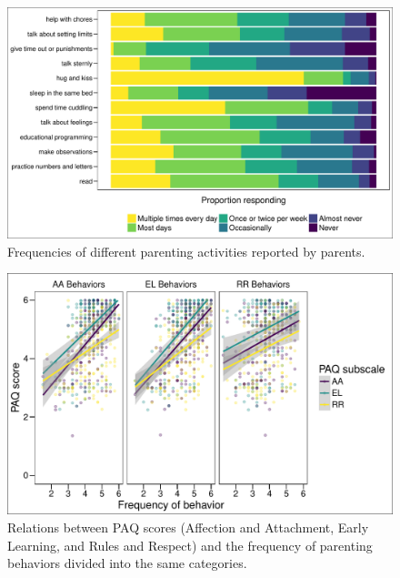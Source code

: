 \documentclass[man]{apa6}
\theoremstyle{definition}
\theoremstyle{definition}
\theoremstyle{definition}
\theoremstyle{remark}
\begin{document}
\begin{figure}
\centering
\includegraphics{PAQ_paper_files/figure-latex/behavefreq-1.pdf}
\caption{\label{fig:behavefreq}Frequencies of different parenting activities
reported by parents.}
\end{figure}

\begin{figure}
\centering
\includegraphics{PAQ_paper_files/figure-latex/behavepaq-1.pdf}
\caption{\label{fig:behavepaq}Relations between PAQ scores (Affection and
Attachment, Early Learning, and Rules and Respect) and the frequency of
parenting behaviors divided into the same categories.}
\end{figure}
\end{document}
